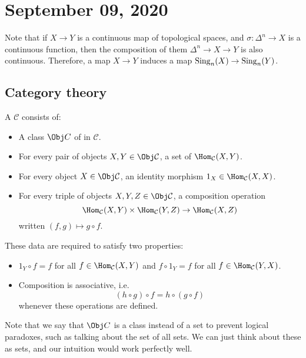 \documentclass{standalone}
\begin{document}
\chapter{September 09, 2020}
Note that if \(X \to Y\) is a continuous map of topological spaces,
and \(\sigma \colon \Delta^n \to X\) is a continuous function,
then the composition of them \(\Delta^n \to X \to Y\) is also continuous.
Therefore, a map \(X \to Y\) induces a map \(\operatorname{Sing}_n(X) \to \operatorname{Sing}_n(Y)\).

\section{Category theory}
\begin{definition}
  A  \(\mathcal C\) consists of:
  \begin{itemize}[nosep]
    \item A class \(\Obj C\) of  in \(\mathcal C\).
    \item For every pair of objects \(X, Y \in \Obj \mathcal C\),
      a set of  \(\Hom_{\mathcal C}(X, Y)\).
    \item For every object \(X \in \Obj \mathcal C\),
      an identity morphism \(1_X \in \Hom_{\mathcal C}(X, X)\).
    \item For every triple of objects \(X, Y, Z \in \Obj \mathcal C\),
      a composition operation
      \[
        \Hom_{\mathcal C}(X, Y) \times \Hom_{\mathcal C}(Y, Z)
        \to
        \Hom_{\mathcal C}(X, Z)
      \]
      written \((f, g) \mapsto g \circ f\).
  \end{itemize}
  These data are required to satisfy two properties:
  \begin{itemize}[nosep]
    \item \(1_Y \circ f = f\) for all \(f \in \Hom_{\mathcal C}(X, Y)\) and
      \(f \circ 1_Y = f\) for all \(f \in \Hom_{\mathcal C}(Y, X)\).
    \item Composition is associative, i.e.
      \[
        (h \circ g) \circ f = h \circ (g \circ f)
      \]
      whenever these operations are defined.
  \end{itemize}
\end{definition}

Note that we say that \(\Obj C\) is a class instead of a set to prevent
logical paradoxes, such as talking about the set of all sets.
We can just think about these as sets, and our intuition would
work perfectly well.
\end{document}
